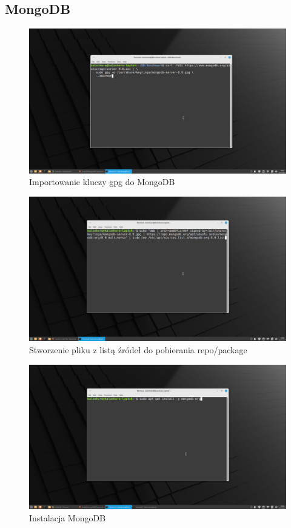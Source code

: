 \documentclass[11pt]{article}
\begin{document}
	\subsection{MongoDB}
		\begin{figure}[!ht]
			\includegraphics[width=\textwidth]{4_importowanie_klucza_gpg.png}
			\caption{Importowanie kluczy gpg do MongoDB}
		\end{figure}

\newpage
		\begin{figure}[!ht]
			\includegraphics[width=\textwidth]{5_tworzenie_pliku_z_listami_source_do_repo.png}
			\caption{Stworzenie pliku z listą źródeł do pobierania repo/package}
		\end{figure}
		\begin{figure}[!ht]
			\includegraphics[width=\textwidth]{6_instalacja_mongodb.png}
			\caption{Instalacja MongoDB}
		\end{figure}
\end{document}
